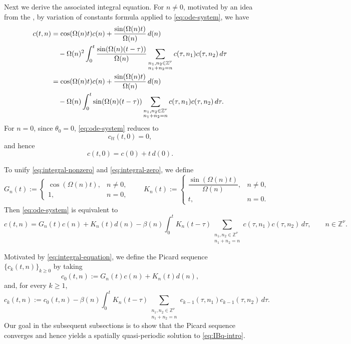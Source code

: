 \documentclass[12pt,reqno,tbtags]{amsart}
\newcommand\1{\mathbbm{1}}
\begin{document}
Next we derive the associated integral equation. For $n\neq 0$, motivated by an idea from the \cite{KPV91}, by variation of constants formula applied to \eqref{eq:ode-system}, we have
\begin{align}
c(t,n)
&=
\cos(\Omega(n)t)c(n)
+\frac{\sin(\Omega(n)t)}{\Omega(n)}\,d(n) \notag\\
&\quad
-\Omega(n)^2
\int_0^t
\frac{\sin(\Omega(n)(t-\tau))}{\Omega(n)}
\sum_{\substack{n_1,n_2\in\mathbb{Z}^{\nu}\\ n_1+n_2=n}}
c(\tau,n_1)c(\tau,n_2)\,d\tau \notag\\
&=
\cos(\Omega(n)t)c(n)
+\frac{\sin(\Omega(n)t)}{\Omega(n)}\,d(n) \notag\\
&\quad
-\Omega(n)
\int_0^t
\sin(\Omega(n)(t-\tau))
\sum_{\substack{n_1,n_2\in\mathbb{Z}^{\nu}\\ n_1+n_2=n}}
c(\tau,n_1)c(\tau,n_2)\,d\tau .
\label{eq:integral-nonzero}
\end{align}
For $n=0$, since $\theta_0=0$, \eqref{eq:ode-system} reduces to
\[
c_{tt}(t,0)=0,
\]
and hence
\begin{equation}\label{eq:integral-zero}
c(t,0)=c(0)+t\,d(0).
\end{equation}

To unify \eqref{eq:integral-nonzero} and \eqref{eq:integral-zero}, we define
\begin{equation*}
G_n(t):=
\begin{cases}
\cos(\Omega(n)t), & n\neq 0,\\
1, & n=0,
\end{cases}
\qquad
K_n(t):=
\begin{cases}
\dfrac{\sin(\Omega(n)t)}{\Omega(n)}, & n\neq 0,\\
t, & n=0.
\end{cases}
\end{equation*}
Then \eqref{eq:ode-system} is equivalent to
\begin{equation}\label{eq:integral-equation}
c(t,n)
=
G_n(t)c(n)+K_n(t)d(n)
-\beta(n)\int_0^t K_n(t-\tau)
\sum_{\substack{n_1,n_2\in\mathbb{Z}^{\nu}\\ n_1+n_2=n}}
c(\tau,n_1)c(\tau,n_2)\,d\tau,
\qquad n\in\mathbb{Z}^{\nu}.
\end{equation}

Motivated by \eqref{eq:integral-equation}, we define the Picard sequence $\{c_k(t,n)\}_{k\geq 0}$ by taking
\begin{equation*}
c_0(t,n):=G_n(t)c(n)+K_n(t)d(n),
\end{equation*}
and, for every $k\geq 1$,
\begin{equation}\label{eq:picard-iteration-recall}
c_k(t,n)
:=
c_0(t,n)
-\beta(n)\int_0^t K_n(t-\tau)
\sum_{\substack{n_1,n_2\in\mathbb{Z}^{\nu}\\ n_1+n_2=n}}
c_{k-1}(\tau,n_1)c_{k-1}(\tau,n_2)\,d\tau.
\end{equation}
Our goal in the subsequent subsections is to show that the Picard sequence converges and hence yields a spatially quasi-periodic solution to \eqref{eq:IBq-intro}.
\end{document}
